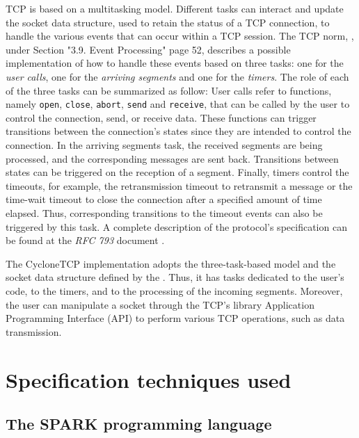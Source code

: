\documentclass[conference]{IEEEtran}
\begin{document}

TCP is based on a multitasking model. Different tasks can interact and update the socket data structure, used to retain the status of a TCP connection, to handle the various events that can occur within a TCP session. The TCP norm, \cite{rfc793} , under Section "3.9. Event Processing" page 52, describes a possible implementation of how to handle these events based on three tasks: one for the \emph{user calls}, one for the \emph{arriving segments} and one for the \emph{timers}. The role of each of the three tasks can be summarized as follow: User calls refer to functions, namely \texttt{open}, \texttt{close}, \texttt{abort}, \texttt{send} and \texttt{receive}, that can be called by the user to control the connection, send, or receive data. These functions can trigger transitions between the connection's states since they are intended to control the connection. In the arriving segments task, the received segments are being processed,
and the corresponding messages are sent back. Transitions between states can be triggered on the reception of a segment. Finally, timers control the timeouts, for example, the retransmission timeout to retransmit a message or the time-wait timeout to close the connection after a specified amount of time elapsed. Thus, corresponding transitions to the timeout events can also be triggered by this task. A complete description of the protocol's specification can be found at the \emph{RFC 793} document \cite{rfc793}.

The CycloneTCP implementation adopts the three-task-based model and the socket data structure defined by the \cite{rfc793}. Thus, it has tasks dedicated to the user's code, to the timers, and to the processing of the incoming segments. Moreover, the user can manipulate a socket through the TCP's library Application Programming Interface (API) to perform various TCP operations, such as data transmission.

\section{Specification techniques used}
\label{sec:spec}

\subsection{The SPARK programming language}
\end{document}
